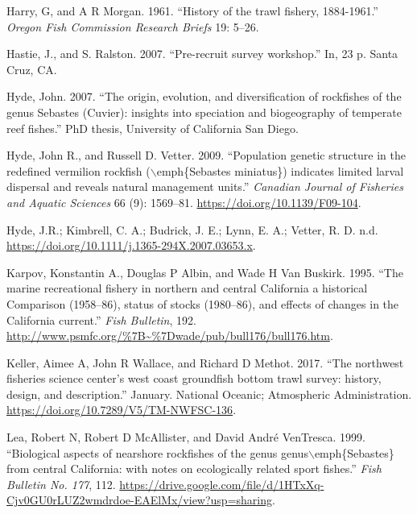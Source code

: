 \documentclass[
  english,
  a4paper,
]{article}
\newlength{\cslhangindent}
\newlength{\cslentryspacingunit} %
\newenvironment{CSLReferences}[2] %
 {%
  \setlength{\parindent}{0pt}
  \ifodd #1
  \let\oldpar\par
  \def\par{\hangindent=\cslhangindent\oldpar}
  \fi
  \setlength{\parskip}{#2\cslentryspacingunit}
 }%
 {}
\begin{document}
\begin{CSLReferences}{1}{0}
\leavevmode{}%
Harry, G, and A R Morgan. 1961. {``{History of the trawl fishery, 1884-1961}.''} \emph{Oregon Fish Commission Research Briefs} 19: 5--26.

\leavevmode{}%
Hastie, J., and S. Ralston. 2007. {``{Pre-recruit survey workshop}.''} In, 23 p. Santa Cruz, CA.

\leavevmode{}%
Hyde, John. 2007. {``{The origin, evolution, and diversification of rockfishes of the genus Sebastes (Cuvier): insights into speciation and biogeography of temperate reef fishes}.''} PhD thesis, University of California San Diego.

\leavevmode{}%
Hyde, John R., and Russell D. Vetter. 2009. {``{Population genetic structure in the redefined vermilion rockfish (\(\backslash\)emph{\{}Sebastes miniatus{\}}) indicates limited larval dispersal and reveals natural management units}.''} \emph{Canadian Journal of Fisheries and Aquatic Sciences} 66 (9): 1569--81. \url{https://doi.org/10.1139/F09-104}.

\leavevmode{}%
Hyde, J.R.; Kimbrell, C. A.; Budrick, J. E.; Lynn, E. A.; Vetter, R. D. n.d. \url{https://doi.org/10.1111/j.1365-294X.2007.03653.x}.

\leavevmode{}%
Karpov, Konstantin A., Douglas P Albin, and Wade H Van Buskirk. 1995. {``{The marine recreational fishery in northern and central California a historical Comparison (1958--86), status of stocks (1980--86), and effects of changes in the California current}.''} \emph{Fish Bulletin}, 192. \url{http://www.psmfc.org/\%7B~\%7Dwade/pub/bull176/bull176.htm}.

\leavevmode{}%
Keller, Aimee A, John R Wallace, and Richard D Methot. 2017. {``{The northwest fisheries science center's west coast groundfish bottom trawl survey: history, design, and description}.''} January. National Oceanic; Atmospheric Administration. \url{https://doi.org/10.7289/V5/TM-NWFSC-136}.

\leavevmode{}%
Lea, Robert N, Robert D McAllister, and David André VenTresca. 1999. {``{Biological aspects of nearshore rockfishes of the genus genus\(\backslash\)emph{\{}Sebastes{\}} from central California: with notes on ecologically related sport fishes}.''} \emph{Fish Bulletin No. 177}, 112. \url{https://drive.google.com/file/d/1HTxXq-Cjv0GU0rLUZ2wmdrdoe-EAElMx/view?usp=sharing}.


\end{CSLReferences}
\end{document}
